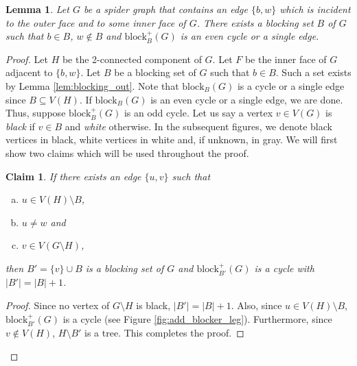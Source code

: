 \documentclass{patmorin}
\newcommand{\block}{\mathrm{block}}
\newtheorem{lemma}[theorem]{Lemma}
\newtheorem{claim}{Claim}[theorem]
\begin{document}
\begin{lemma}
 Let $G$ be a spider graph that contains an edge $\{b,w\}$ which is incident to the outer face and to some inner face of $G$. There exists a blocking set $B$ of $G$ such that $b \in B$, $w \notin B$ and $\block_{B}^+(G)$ is an even cycle or a single edge.
 \label{lem:cycle_spider_even}
\end{lemma}

\begin{proof}
 
Let $H$ be the 2-connected component of $G$. Let $F$ be the inner face of $G$ adjacent to $\{b,w\}$. Let $B$ be a blocking set of $G$ such that $b \in B$. Such a set exists by Lemma \ref{lem:blocking_out}. Note that $\block_B(G)$ is a cycle or a single edge since $B \subseteq V(H)$. If $\block_B(G)$ is an even cycle or a single edge, we are done. Thus, suppose $\block_B^+(G)$ is an odd cycle. Let us say a vertex $v \in V(G)$ is \emph{black} if $v \in B$ and \emph{white} otherwise. In the subsequent figures, we denote black vertices in black,  white vertices in white and, if unknown, in gray. We will first show two claims which will be used throughout the proof.
 
\begin{claim}
 If there exists an edge $\{u,v\}$ such that 
 \begin{enumerate}[a)]
  \item $u \in V(H)\setminus B$, 
  \item $u\not=w$ and 
  \item $v \in V(G\setminus H)$,
 \end{enumerate}
 then $B'=\{v\}\cup B$ is a blocking set of $G$ and $\block_{B'}^+(G)$ is a cycle with $|B'| = |B| +1$.
 \label{claim:add_blocker_leg}
\end{claim}
\begin{proof}
 Since no vertex of $G\setminus H$ is black, $|B'| = |B| +1$. Also, since $u \in V(H)\setminus B$, $\block_{B'}^+(G)$ is a cycle (see Figure \ref{fig:add_blocker_leg}).  Furthermore, since $v\notin V(H)$, $H\setminus B'$ is a tree. This completes the proof.
\end{proof}

\begin{figure}[!ht]
  \centering
  
\end{figure}
\end{proof}
\end{document}
